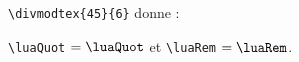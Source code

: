\documentclass[varwidth, border = 3pt]{standalone}
\begin{document}

\verb+\divmodtex{45}{6}+ donne :

\verb+\luaQuot+ $= \luaQuot$
et
\verb+\luaRem+  $= \luaRem$.
\end{document}
